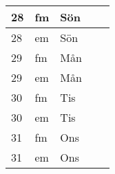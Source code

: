 \documentclass[a4paper]{article}
\begin{document}
\begin{table}[ht!]
\begin{tabular}{lllp{7cm}p{7cm}}
\multicolumn{1}{|l|}{28} & \multicolumn{1}{l|}{fm} & \multicolumn{1}{l|}{Sön} & \multicolumn{1}{l|}{} & \multicolumn{1}{l|}{} \\ \hline
\multicolumn{1}{|l|}{28} & \multicolumn{1}{l|}{em} & \multicolumn{1}{l|}{Sön} & \multicolumn{1}{l|}{} & \multicolumn{1}{l|}{} \\ \hline    

\multicolumn{1}{|l|}{29} & \multicolumn{1}{l|}{fm} & \multicolumn{1}{l|}{Mån} & \multicolumn{1}{l|}{} & \multicolumn{1}{l|}{} \\ \hline
\multicolumn{1}{|l|}{29} & \multicolumn{1}{l|}{em} & \multicolumn{1}{l|}{Mån} & \multicolumn{1}{l|}{} & \multicolumn{1}{l|}{} \\ \hline    

\multicolumn{1}{|l|}{30} & \multicolumn{1}{l|}{fm} & \multicolumn{1}{l|}{Tis} & \multicolumn{1}{l|}{} & \multicolumn{1}{l|}{} \\ \hline
\multicolumn{1}{|l|}{30} & \multicolumn{1}{l|}{em} & \multicolumn{1}{l|}{Tis} & \multicolumn{1}{l|}{} & \multicolumn{1}{l|}{} \\ \hline    

\multicolumn{1}{|l|}{31} & \multicolumn{1}{l|}{fm} & \multicolumn{1}{l|}{Ons} & \multicolumn{1}{l|}{} & \multicolumn{1}{l|}{} \\ \hline
\multicolumn{1}{|l|}{31} & \multicolumn{1}{l|}{em} & \multicolumn{1}{l|}{Ons} & \multicolumn{1}{l|}{} & \multicolumn{1}{l|}{} \\ \hline    

    \end{tabular}
    \end{table}
    
\end{document}
